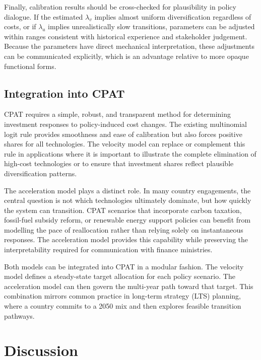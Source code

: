 \documentclass[preprint,authoryear,12pt]{elsarticle}
\begin{document}
Finally, calibration results should be cross-checked for plausibility in policy dialogue. If the
estimated $\lambda_v$ implies almost uniform diversification regardless of costs, or if $\lambda_a$
implies unrealistically slow transitions, parameters can be adjusted within ranges consistent with
historical experience and stakeholder judgement. Because the parameters have direct mechanical
interpretation, these adjustments can be communicated explicitly, which is an advantage relative
to more opaque functional forms.

\subsection{Integration into CPAT}

CPAT requires a simple, robust, and transparent method for determining investment responses to
policy-induced cost changes. The existing multinomial logit rule provides smoothness and ease of
calibration but also forces positive shares for all technologies. The velocity model can replace or
complement this rule in applications where it is important to illustrate the complete elimination
of high-cost technologies or to ensure that investment shares reflect plausible diversification
patterns.

The acceleration model plays a distinct role. In many country engagements, the central
question is not which technologies ultimately dominate, but how quickly the system can transition.
CPAT scenarios that incorporate carbon taxation, fossil-fuel subsidy reform, or renewable energy
support policies can benefit from modelling the pace of reallocation rather than relying solely on
instantaneous responses. The acceleration model provides this capability while preserving the
interpretability required for communication with finance ministries.

Both models can be integrated into CPAT in a modular fashion. The velocity model defines a
steady-state target allocation for each policy scenario. The acceleration model can then govern
the multi-year path toward that target. This combination mirrors common practice in long-term
strategy (LTS) planning, where a country commits to a 2050 mix and then explores feasible
transition pathways.
\newpage

\section{Discussion}
\end{document}
